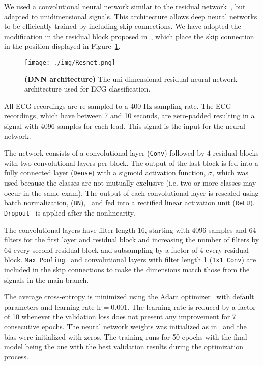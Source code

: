 \documentclass{article}
\begin{document}
We used a convolutional neural network similar to the residual network~\cite{he_deep_2016}, but adapted to unidimensional signals. This architecture allows deep neural networks to be efficiently trained by including skip connections. We have adopted the modification in the  residual block proposed in~\cite{he_identity_2016}, which place the skip connection in the position displayed in Figure~\ref{fig:Resnet}. 

\begin{figure}[ht]
    \centering
	\texttt{[image: ./img/Resnet.png]}
    \caption{\textbf{(DNN architecture)} The uni-dimensional residual neural network architecture used for ECG classification.}
    \label{fig:Resnet}
\end{figure}

All ECG recordings are re-sampled to a 400 Hz sampling rate. The ECG recordings, which have between 7 and 10 seconds, are zero-padded resulting in a signal with 4096 samples for each lead. This signal is the input for the neural network.

The network consists of a convolutional layer (\texttt{Conv})  followed by $4$ residual blocks  with two convolutional layers per block.  The output of the last block is fed into a fully connected layer (\texttt{Dense}) with a sigmoid activation function, $\sigma$, which was used because the classes are not mutually exclusive (i.e. two or more classes may occur in the same exam). The output of each convolutional layer is rescaled using batch normalization, (\texttt{BN}),~\cite{ioffe_batch_2015} and fed into a rectified linear activation unit (\texttt{ReLU}). \texttt{Dropout}~\cite{srivastava_dropout_2014} is applied after the nonlinearity.

The convolutional layers have filter length 16, starting with 4096 samples and 64 filters for the first layer and residual block and increasing the number of filters by 64 every second residual block and subsampling by a factor of 4 every residual block.  \texttt{Max Pooling}~\cite{hutchison_evaluation_2010} and convolutional layers with filter length 1 (\texttt{1x1 Conv}) are included in the skip connections to make the dimensions match those from the signals in the main branch.

The average cross-entropy is minimized using the Adam optimizer~\cite{kingma_adam_2014} with default parameters and learning rate $\text{lr} = 0.001$. The learning rate is reduced by a factor of 10 whenever the validation loss does not present any improvement for 7 consecutive epochs. The neural network weights was initialized as in~\cite{he_delving_2015} and the bias were initialized with zeros. The training runs for 50 epochs with the final model being  the one with the best validation results during the optimization process.
\end{document}
